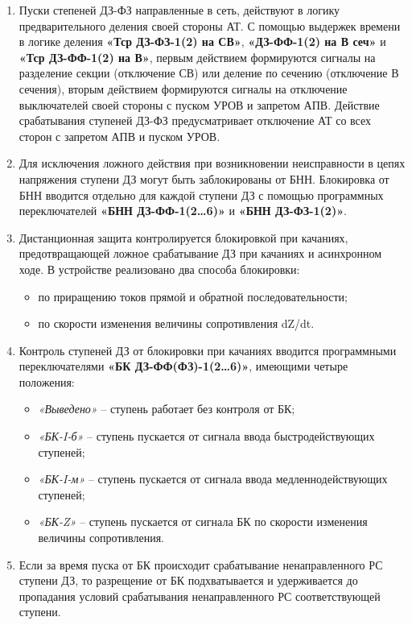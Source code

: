 \begin{enumerate}[label=\arabic{section}.\arabic{subsection}.\arabic*,  align=left, labelsep=4pt, leftmargin=0pt, itemindent=57pt]
\item
Пуски степеней ДЗ-ФЗ направленные в сеть, действуют в логику предварительного деления своей стороны АТ. С помощью выдержек времени в логике деления \textbf{«Тср ДЗ-ФЗ-1(2) на СВ»}, \textbf{«ДЗ-ФФ-1(2) на В сеч»} и \textbf{«Тср ДЗ-ФФ-1(2) на В»}, первым действием формируются сигналы на разделение секции (отключение СВ) или деление по сечению (отключение В сечения), вторым действием формируются сигналы на отключение выключателей своей стороны с пуском УРОВ и запретом АПВ. Действие срабатывания ступеней ДЗ-ФЗ предусматривает отключение АТ со всех сторон с запретом АПВ и пуском УРОВ.

\item
Для исключения ложного действия при возникновении неисправности в цепях напряжения ступени ДЗ могут быть заблокированы от БНН. Блокировка от БНН вводится отдельно для каждой ступени ДЗ с помощью программных переключателей \textbf{«БНН ДЗ-ФФ-1(2…6)»} и \textbf{«БНН ДЗ-ФЗ-1(2)»}.

\item
Дистанционная защита контролируется блокировкой при качаниях, предотвращающей ложное срабатывание ДЗ при качаниях и асинхронном ходе. В устройстве реализовано два способа блокировки:
\begin{itemize}
\item по приращению токов прямой и обратной последовательности;
\item по скорости изменения величины сопротивления dZ/dt.
\end{itemize}

\item
Контроль ступеней ДЗ от блокировки при качаниях вводится программными переключателями \textbf{«БК ДЗ-ФФ(ФЗ)-1(2…6)»}, имеющими четыре положения:
\begin{itemize}
\item \textit{«Выведено»} -- ступень работает без контроля от БК;
\item \textit{«БК-I-б»} -- ступень пускается от сигнала ввода быстродействующих ступеней;
\item \textit{«БК-I-м»} -- ступень пускается от сигнала ввода медленнодействующих ступеней;
\item \textit{«БК-Z»} -- ступень пускается от сигнала БК по скорости изменения величины сопротивления.
\end{itemize}

\item
Если за время пуска от БК происходит срабатывание ненаправленного РС ступени ДЗ, то разрещение от БК подхватывается и удерживается до пропадания условий срабатывания ненаправленного РС соответствующей ступени.


\end{enumerate}
